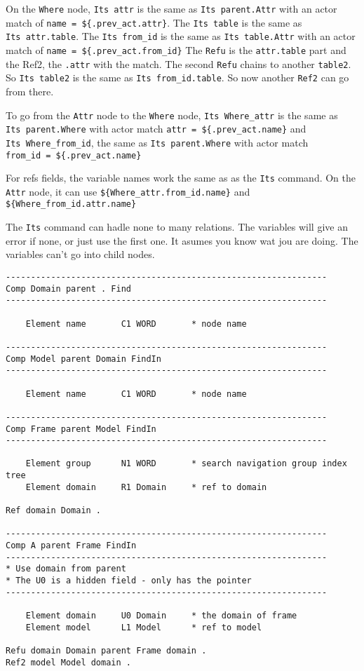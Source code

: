 \documentclass[11pt]{article}
\begin{document}
On the \texttt{Where} node, \texttt{Its\ attr} is the same as
\texttt{Its\ parent.Attr} with an actor match of
\texttt{name\ =\ \$\{.prev\_act.attr\}}. The \texttt{Its\ table} is the
same as \texttt{Its\ attr.table}. The \texttt{Its\ from\_id} is the same
as \texttt{Its\ table.Attr} with an actor match of
\texttt{name\ =\ \$\{.prev\_act.from\_id\}} The \texttt{Refu} is the
\texttt{attr.table} part and the Ref2, the \texttt{.attr} with the
match. The second \texttt{Refu} chains to another \texttt{table2}. So
\texttt{Its\ table2} is the same as \texttt{Its\ from\_id.table}. So now
another \texttt{Ref2} can go from there.

To go from the \texttt{Attr} node to the \texttt{Where} node,
\texttt{Its\ Where\_attr} is the same as \texttt{Its\ parent.Where} with
actor match \texttt{attr\ =\ \$\{.prev\_act.name\}} and
\texttt{Its\ Where\_from\_id}, the same as \texttt{Its\ parent.Where}
with actor match \texttt{from\_id\ =\ \$\{.prev\_act.name\}}

For refs fields, the variable names work the same as as the \texttt{Its}
command. On the \texttt{Attr} node, it can use
\texttt{\$\{Where\_attr.from\_id.name\}} and
\texttt{\$\{Where\_from\_id.attr.name\}}

The \texttt{Its} command can hadle none to many relations. The variables
will give an error if none, or just use the first one. It asumes you
know wat jou are doing. The variables can't go into child nodes.

\begin{verbatim}
----------------------------------------------------------------
Comp Domain parent . Find
----------------------------------------------------------------

    Element name       C1 WORD       * node name

----------------------------------------------------------------
Comp Model parent Domain FindIn
----------------------------------------------------------------

    Element name       C1 WORD       * node name

----------------------------------------------------------------
Comp Frame parent Model FindIn
----------------------------------------------------------------

    Element group      N1 WORD       * search navigation group index tree
    Element domain     R1 Domain     * ref to domain

Ref domain Domain .

----------------------------------------------------------------
Comp A parent Frame FindIn
----------------------------------------------------------------
* Use domain from parent
* The U0 is a hidden field - only has the pointer
----------------------------------------------------------------

    Element domain     U0 Domain     * the domain of frame
    Element model      L1 Model      * ref to model

Refu domain Domain parent Frame domain .
Ref2 model Model domain .
\end{verbatim}
\end{document}
